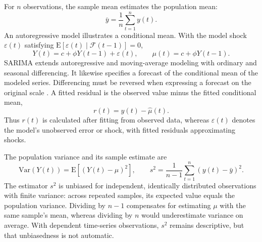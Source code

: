 \documentclass[12pt,a4paper]{article}
\numberwithin{equation}{section}
\numberwithin{table}{section}
\numberwithin{figure}{section}
\begin{document}
For $n$ observations, the sample mean estimates the population mean:
\begin{equation}\label{eq:sample-mean}
\bar{y}=\frac{1}{n}\sum_{t=1}^{n}y(t).
\end{equation}
An autoregressive model illustrates a conditional mean. With the model shock $\varepsilon(t)$ satisfying $\mathrm{E}[\varepsilon(t)\mid\mathcal{F}(t-1)]=0$,
\begin{equation}\label{eq:ar-mean}
Y(t)=c+\phi Y(t-1)+\varepsilon(t),\qquad \mu(t)=c+\phi Y(t-1).
\end{equation}
SARIMA extends autoregressive and moving-average modeling with ordinary and seasonal differencing. It likewise specifies a forecast of the conditional mean of the modeled series. Differencing must be reversed when expressing a forecast on the original scale \cite{boxjenkins1970}. A fitted residual is the observed value minus the fitted conditional mean,
\begin{equation}\label{eq:residual}
r(t)=y(t)-\widehat{\mu}(t).
\end{equation}
Thus $r(t)$ is calculated after fitting from observed data, whereas $\varepsilon(t)$ denotes the model's unobserved error or shock, with fitted residuals approximating shocks.

The population variance and its sample estimate are
\begin{equation}\label{eq:variance}
\mathrm{Var}(Y(t))=\mathrm{E}[(Y(t)-\mu)^2],\qquad
s^2=\frac{1}{n-1}\sum_{t=1}^{n}(y(t)-\bar{y})^2.
\end{equation}
The estimator $s^2$ is unbiased for independent, identically distributed observations with finite variance: across repeated samples, its expected value equals the population variance. Dividing by $n-1$ compensates for estimating $\mu$ with the same sample's mean, whereas dividing by $n$ would underestimate variance on average. With dependent time-series observations, $s^2$ remains descriptive, but that unbiasedness is not automatic.
\end{document}
